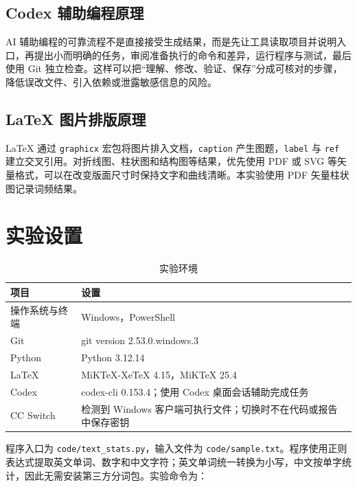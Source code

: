\documentclass{SYSUReport}
\begin{document}
\subsection{Codex 辅助编程原理}

AI 辅助编程的可靠流程不是直接接受生成结果，而是先让工具读取项目并说明入口，再提出小而明确的任务，审阅准备执行的命令和差异，运行程序与测试，最后使用 Git 独立检查。这样可以把“理解、修改、验证、保存”分成可核对的步骤，降低误改文件、引入依赖或泄露敏感信息的风险。

\subsection{LaTeX 图片排版原理}

LaTeX 通过 \texttt{graphicx} 宏包将图片排入文档，\texttt{caption} 产生图题，\texttt{label} 与 \texttt{ref} 建立交叉引用。对折线图、柱状图和结构图等结果，优先使用 PDF 或 SVG 等矢量格式，可以在改变版面尺寸时保持文字和曲线清晰。本实验使用 PDF 矢量柱状图记录词频结果。

\section{实验设置}

\begin{table}[htbp]
    \centering
    \caption{实验环境}
    \label{tab:environment}
    \begin{tabular}{>{\raggedright\arraybackslash}p{}p{}}
        \toprule
        项目 & 设置 \\
        \midrule
        操作系统与终端 & Windows，PowerShell \\
        Git & git version 2.53.0.windows.3 \\
        Python & Python 3.12.14 \\
        LaTeX & MiKTeX-XeTeX 4.15，MiKTeX 25.4 \\
        Codex & codex-cli 0.153.4；使用 Codex 桌面会话辅助完成任务 \\
        CC Switch & 检测到 Windows 客户端可执行文件；切换时不在代码或报告中保存密钥 \\
        \bottomrule
    \end{tabular}
\end{table}

程序入口为 \texttt{code/text\_stats.py}，输入文件为 \texttt{code/sample.txt}。程序使用正则表达式提取英文单词、数字和中文字符；英文单词统一转换为小写，中文按单字统计，因此无需安装第三方分词包。实验命令为：
\end{document}
